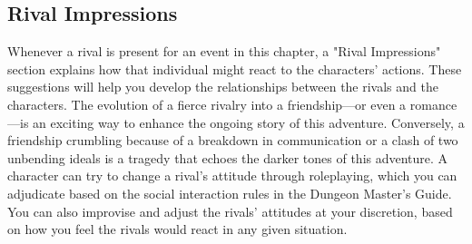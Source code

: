 \documentclass[10pt,a4,twoside,twocolumn,openany,nodeprecatedcode]{dndbook}
\begin{document}
\subsection{Rival Impressions}
Whenever a rival is present for an event in this chapter, a "Rival Impressions" section explains how that individual might react to the characters' actions. These suggestions will help you develop the relationships between the rivals and the characters. The evolution of a fierce rivalry into a friendship—or even a romance—is an exciting way to enhance the ongoing story of this adventure. Conversely, a friendship crumbling because of a breakdown in communication or a clash of two unbending ideals is a tragedy that echoes the darker tones of this adventure.
A character can try to change a rival's attitude through roleplaying, which you can adjudicate based on the social interaction rules in the Dungeon Master's Guide. You can also improvise and adjust the rivals' attitudes at your discretion, based on how you feel the rivals would react in any given situation.
\end{document}
